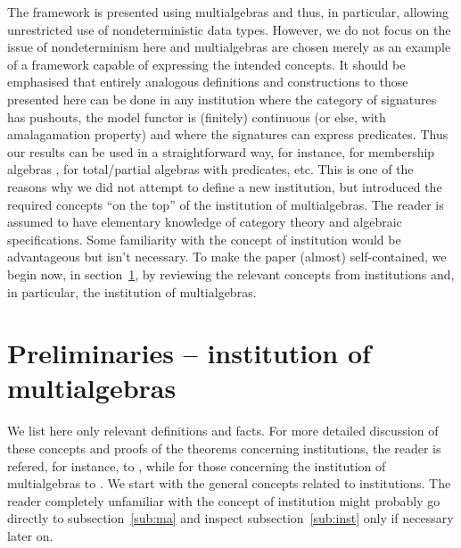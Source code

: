 The framework is presented using multialgebras \cite{calc,multi} and thus, in particular, allowing
unrestricted use of nondeterministic data types. However, we do not focus on the issue
of nondeterminism here and multialgebras are chosen merely as an example of a
framework capable of expressing the intended concepts. It should be
emphasised that entirely analogous definitions and constructions to those
presented here can be done in any institution where the category of
signatures has pushouts, the model functor is (finitely) continuous
(or else, with amalagamation property) and where the signatures
can express predicates. Thus our  results can be used in a
straightforward way, for instance, for membership algebras \cite{member}, 
for total/partial algebras with predicates, etc. This is one of the reasons
why we did not attempt to define a new institution, but introduced the
required concepts ``on the top'' of the institution of multialgebras. The
reader is assumed to have elementary knowledge of category theory and
algebraic specifications. Some
familiarity with the concept of institution would be advantageous but isn't necessary. To make
the paper (almost) self-contained, we
begin now, in section~\ref{se:ma}, by reviewing the relevant concepts from
institutions and, in particular, the institution of multialgebras.


\section{Preliminaries -- institution of multialgebras}\label{se:ma}
We list here only relevant definitions and facts. For more detailed
discussion of these concepts and proofs of the theorems concerning
institutions, the reader is refered, for instance, to
\cite{stateinst}, while for those
concerning the institution of multialgebras to \cite{MAinst}.
We start with the general concepts related to institutions.
The reader completely unfamiliar with the concept of institution might
probably go directly to subsection~\ref{sub:ma} and inspect subsection~\ref{sub:inst}
only if necessary later on.


